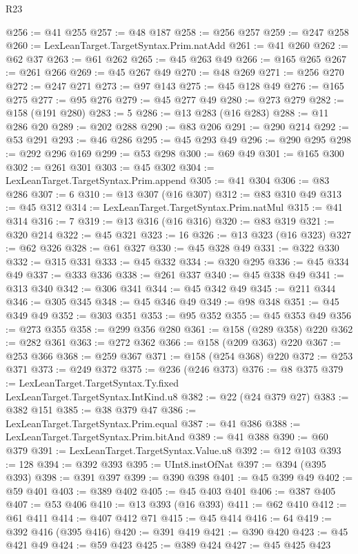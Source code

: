 \begin{lexlean}{R23}
\begin{coremodule}
@256 := @41 @255
@257 := @48 @187
@258 := @256 @257
@259 := @247 @258
@260 := LexLeanTarget.TargetSyntax.Prim.natAdd
@261 := @41 @260
@262 := @62 @37
@263 := @61 @262
@265 := @45 @263 @49
@266 := @165 @265
@267 := @261 @266
@269 := @45 @267 @49
@270 := @48 @269
@271 := @256 @270
@272 := @247 @271
@273 := @97 @143
@275 := @45 @128 @49
@276 := @165 @275
@277 := @95 @276
@279 := @45 @277 @49
@280 := @273 @279
@282 := @158 (@191 @280)
@283 := 5
@286 := @13 @283 (@16 @283)
@288 := @11 @286 @20
@289 := @202 @288
@290 := @83 @206
@291 := @290 @214
@292 := @53 @291
@293 := @46 @286
@295 := @45 @293 @49
@296 := @290 @295
@298 := @292 @296 @169
@299 := @53 @298
@300 := @69 @49
@301 := @165 @300
@302 := @261 @301
@303 := @45 @302
@304 := LexLeanTarget.TargetSyntax.Prim.append
@305 := @41 @304
@306 := @83 @286
@307 := 6
@310 := @13 @307 (@16 @307)
@312 := @83 @310 @49
@313 := @45 @312
@314 := LexLeanTarget.TargetSyntax.Prim.natMul
@315 := @41 @314
@316 := 7
@319 := @13 @316 (@16 @316)
@320 := @83 @319
@321 := @320 @214
@322 := @45 @321
@323 := 16
@326 := @13 @323 (@16 @323)
@327 := @62 @326
@328 := @61 @327
@330 := @45 @328 @49
@331 := @322 @330
@332 := @315 @331
@333 := @45 @332
@334 := @320 @295
@336 := @45 @334 @49
@337 := @333 @336
@338 := @261 @337
@340 := @45 @338 @49
@341 := @313 @340
@342 := @306 @341
@344 := @45 @342 @49
@345 := @211 @344
@346 := @305 @345
@348 := @45 @346 @49
@349 := @98 @348
@351 := @45 @349 @49
@352 := @303 @351
@353 := @95 @352
@355 := @45 @353 @49
@356 := @273 @355
@358 := @299 @356 @280
@361 := @158 (@289 @358) @220
@362 := @282 @361
@363 := @272 @362
@366 := @158 (@209 @363) @220
@367 := @253 @366
@368 := @259 @367
@371 := @158 (@254 @368) @220
@372 := @253 @371
@373 := @249 @372
@375 := @236 (@246 @373)
@376 := @8 @375
@379 := LexLeanTarget.TargetSyntax.Ty.fixed LexLeanTarget.TargetSyntax.IntKind.u8
@382 := @22 (@24 @379 @27)
@383 := @382 @151
@385 := @38 @379 @47
@386 := LexLeanTarget.TargetSyntax.Prim.equal
@387 := @41 @386
@388 := LexLeanTarget.TargetSyntax.Prim.bitAnd
@389 := @41 @388
@390 := @60 @379
@391 := LexLeanTarget.TargetSyntax.Value.u8
@392 := @12 @103
@393 := 128
@394 := @392 @393
@395 := UInt8.instOfNat
@397 := @394 (@395 @393)
@398 := @391 @397
@399 := @390 @398
@401 := @45 @399 @49
@402 := @59 @401
@403 := @389 @402
@405 := @45 @403 @401
@406 := @387 @405
@407 := @53 @406
@410 := @13 @393 (@16 @393)
@411 := @62 @410
@412 := @61 @411
@414 := @407 @412 @71
@415 := @45 @414
@416 := 64
@419 := @392 @416 (@395 @416)
@420 := @391 @419
@421 := @390 @420
@423 := @45 @421 @49
@424 := @59 @423
@425 := @389 @424
@427 := @45 @425 @423

\end{coremodule}
\end{lexlean}
